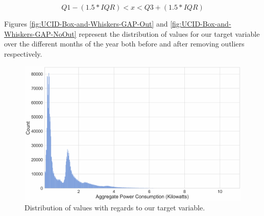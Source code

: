 \begin{adjustwidth}{-1.65cm}{-0.0cm}
\begin{enumerate}[label=Step 3.\arabic*:, leftmargin=*]
    \begin{equation}
        Q1 - (1.5 * IQR) < x < Q3 + (1.5 * IQR)
    \label{eq:IQR-Outliers}
    \end{equation}
    
    \noindent \newline Figures \ref{fig:UCID-Box-and-Whiskers-GAP-Out} and \ref{fig:UCID-Box-and-Whiskers-GAP-NoOut} represent the distribution of values for our target variable over the different months of the year both before and after removing outliers respectively.
    
    \begin{figure}[H]
        \centering
        \includegraphics[width=\textwidth]{Images/Chapter 6/UCID/UCID-GAP-Distribution.pdf}
        \caption{Distribution of values with regards to our target variable.}
        \label{fig:UCID-GAP-Distribution}
    \end{figure}
    

\end{enumerate}
\end{adjustwidth}
